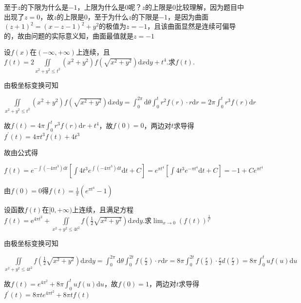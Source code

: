 \begin{xiti}
\begin{solution}
		\begin{note}
			至于$z$的下限为什么是$-1$，上限为什么是$0$呢？$z$的上限是$0$比较理解，因为题目中出现了$z=0$，故$z$的上限是$0$，至于为什么$z$的下限是$-1$，是因为曲面$(z+1)^{2}=(x-z-1)^{2}+y^{2}$的极值为$z=-1$，且该曲面显然是连续可偏导的，故由问题的实际意义知，曲面最值就是$z=-1$
		\end{note}
	\end{solution}
	\item 设$f(x)$在$(-\infty,+\infty)$上连续，且$f\left(t\right)=2\iint\limits_{x^2+y^2\leq t^2}{\left(x^2+y^2\right)}f\left(\sqrt{x^2+y^2}\right)\textrm{d}x\textrm{d}y+t^4$.求$f(t)$.
	\begin{solution}
		由极坐标变换可知
		
		$\iint\limits_{x^{2}+y^{2} \leq t^{2}}\left(x^{2}+y^{2}\right) f\left(\sqrt{x^{2}+y^{2}}\right) \mathrm{d}x \mathrm{d}y=\int_{0}^{2 \pi} \mathrm{d}\theta \int_{0}^{t} r^{2} f(r) \cdot r \mathrm{d}r=2 \pi \int_{0}^{t} r^{3} f(r) \mathrm{d}r$
		
		故$f(t)=4 \pi \int_{0}^{t} r^{3} f(r) \mathrm{d} r+t^{4}$，故$f(0)=0$，两边对$t$求导得$f^{\prime}(t)=4 \pi t^{3} f(t)+4 t^{3}$
		
		故由公式得
		
		$f(t)=e^{-\int\left(-4 \pi t^{3}\right) \mathrm{d} t}\left[\int 4 t^{3} e^{\int\left(-4 \pi t^{3}\right) \mathrm{d} t} \mathrm{d} t+C\right]=e^{\pi t^{4}}\left[\int 4 t^{3} e^{-\pi t^{4}} \mathrm{d} t+C\right]=-1+C e^{\pi t^{4}}$
		
		由$f(0)=0$得$f(t)=\frac{1}{\pi}\left(e^{\pi t^{4}}-1\right)$
	\end{solution}
	\item 	设函数$f(t)$在$[0,+\infty)$上连续，且满足方程$f\left(t\right)=\textrm{e}^{4\pi t^2}+\iint\limits_{x^2+y^2\leq 4t^2}{f\left(\frac{1}{2}\sqrt{x^2+y^2}\right)\textrm{d}x\textrm{d}y}$.求$\lim _{x \rightarrow 0}(f(t))^{\frac{1}{t^{2}}}$
	\begin{solution}
		由极坐标变换可知
		
		$\iint\limits_{x^{2}+y^{2} \leq 4 t^{2}} f\left(\frac{1}{2} \sqrt{x^{2}+y^{2}}\right) \mathrm{d}x \mathrm{d}y=\int_{0}^{2 \pi} \mathrm{d}\theta \int_{0}^{2 t} f\left(\frac{r}{2}\right) \cdot r \mathrm{d}r=8 \pi \int_{0}^{2 t} f\left(\frac{r}{2}\right) \cdot \frac{r}{2} d\left(\frac{r}{2}\right)=8 \pi \int_{0}^{t} u f(u) \mathrm{d}u$
		
		故$f(t)=e^{4 \pi^{2}}+8 \pi \int_{0}^{t} u f(u) \mathrm{d}u$，故$f(0)=1$，两边对$t$求导得$f^{\prime}(t)=8 \pi t e^{4 \pi t^{2}}+8 \pi t f(t)$
		

\end{solution}
\end{xiti}
